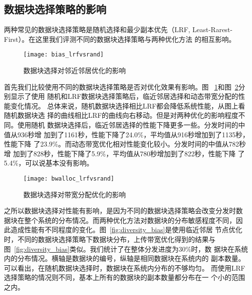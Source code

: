 
\subsection{数据块选择策略的影响}

两种常见的数据块选择策略是随机选择和最少副本优先（LRF,
Least-Rarest-First）。在这里我们评测不同的数据块选择策略与两种优化方法
的相互影响。

\begin{figure}[htbp]
  \centering
  \begin{minipage}{0.6\linewidth}
    \centering
    \texttt{[image: bias\_lrfvsrand]}
    \caption{数据块选择对邻近邻居优化的影响}
    \label{fig:bias_lrfvsrand}
  \end{minipage}
\end{figure}

首先我们比较使用不同的数据块选择策略是否对优化效果有影响。图~
\ref{fig:bias_lrfvsrand}和图~\ref{fig:bwalloc_lrfvsrand}分别显示了使用
随机和LRF数据块选择策略后，临近邻居选择和动态带宽分配的性能变化情况。
总体来说，随机数据块选择相比LRF都会降低系统性能，从图上看随机数据块选
择的曲线相比LRF的曲线向右移动。但是对两种优化的影响程度不同。使用随机
数据块选择后，临近邻居选择的性能下降更多一些。分发时间的中值从936秒增
加到了1161秒，性能下降了24.0\%，平均值从916秒增加到了1135秒，性能下降
了23.9\%。而动态带宽优化相对性能变化较小。分发时间的中值从782秒增
加到了828秒，性能下降了5.9\%，平均值从780秒增加到了822秒，性能下降
了5.4\%，可以说基本没有影响。

\begin{figure}[htbp]
  \centering
  \begin{minipage}{0.6\linewidth}
    \centering
    \texttt{[image: bwalloc\_lrfvsrand]}
    \caption{数据块选择对带宽分配优化的影响}
    \label{fig:bwalloc_lrfvsrand}
  \end{minipage}
\end{figure}

之所以数据块选择对性能有影响，是因为不同的数据块选择策略会改变分发时数
据块在整个系统的分布情况。而两种优化方法对数据块的分布敏感程度不同，因
此造成性能有不同程度的变化。图~\ref{fig:diversity_bias}是使用临近邻居
节点优化时，不同的数据块选择策略下数据块分布，上传带宽优化得到的结果与
图~\ref{fig:diversity_bias}类似。我们统计了在整体分发进度为30\%时，数
据块在系统内的分布情况。横轴是数据块的编号，纵轴是相同数据块在系统内的
副本数量。可以看出，在随机数据块选择时，数据块在系统内分布的不够均匀。
而使用LRF选择策略的情况则不同，基本上所有的数据块的副本数量都分布在一
个小的范围之内。

